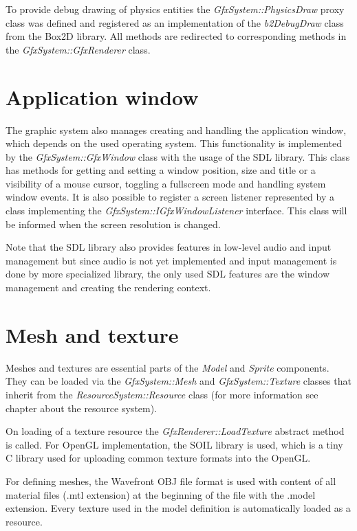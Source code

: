 \documentclass[a4paper, 12pt]{report}
\begin{document}
To provide debug drawing of physics entities the \emph{GfxSystem::PhysicsDraw} proxy class was defined and registered as an implementation of the \emph{b2\-Debug\-Draw} class from the Box2D library. All methods are redirected to corresponding methods in the \emph{GfxSystem::GfxRenderer} class.

\section{Application window}

The graphic system also manages creating and handling the application window, which depends on the used operating system. This functionality is implemented by the \emph{GfxSystem::GfxWindow} class with the usage of the SDL library. This class has methods for getting and setting a window position, size and title or a visibility of a mouse cursor, toggling a fullscreen mode and handling system window events. It is also possible to register a screen listener represented by a class implementing the \emph{GfxSystem::IGfxWindowListener} interface. This class will be informed when the screen resolution is changed.

Note that the SDL library also provides features in low-level audio and input management but since audio is not yet implemented and input management is done by more specialized library, the only used SDL features are the window management and creating the rendering context.

\section{Mesh and texture}

Meshes and textures are essential parts of the \emph{Model} and \emph{Sprite} components. They can be loaded via the \emph{GfxSystem::Mesh} and \emph{GfxSystem::Texture} classes that inherit from the \emph{ResourceSystem::Resource} class (for more information see chapter about the resource system).

On loading of a texture resource the \emph{GfxRenderer::LoadTexture} abstract method is called. For OpenGL implementation, the SOIL library is used, which is a tiny C library used for uploading common texture formats into the OpenGL.

For defining meshes, the Wavefront OBJ file format \cite{obj} is used with content of all material files (.mtl extension) at the beginning of the file with the .model extension. Every texture used in the model definition is automatically loaded as a resource.
 
\end{document}
